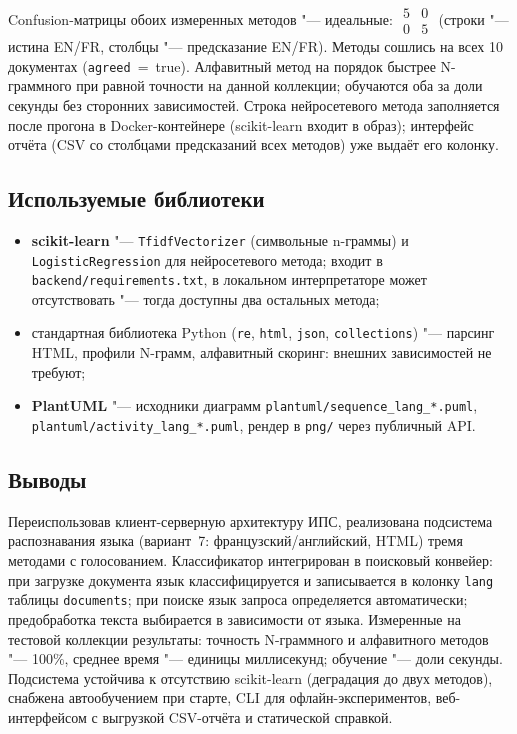 Confusion-матрицы обоих измеренных методов "--- идеальные:
$\begin{smallmatrix} 5 & 0 \\ 0 & 5 \end{smallmatrix}$
(строки "--- истина EN/FR, столбцы "--- предсказание EN/FR).
Методы сошлись на всех 10 документах (\texttt{agreed}~=~true).
Алфавитный метод на порядок быстрее N-граммного при равной точности
на данной коллекции; обучаются оба за доли секунды без сторонних
зависимостей. Строка нейросетевого метода заполняется после прогона
в Docker-контейнере (scikit-learn входит в образ); интерфейс отчёта
(CSV со столбцами предсказаний всех методов) уже выдаёт его колонку.

\subsection{Используемые библиотеки}

\begin{itemize}
	\item \textbf{scikit-learn} "--- \texttt{TfidfVectorizer} (символьные n-граммы) и \texttt{LogisticRegression} для нейросетевого метода; входит в \texttt{backend/requirements.txt}, в локальном интерпретаторе может отсутствовать "--- тогда доступны два остальных метода;
	\item стандартная библиотека Python (\texttt{re}, \texttt{html}, \texttt{json}, \texttt{collections}) "--- парсинг HTML, профили N-грамм, алфавитный скоринг: внешних зависимостей не требуют;
	\item \textbf{PlantUML} "--- исходники диаграмм \texttt{plantuml/sequence\_lang\_*.puml}, \texttt{plantuml/activity\_lang\_*.puml}, рендер в \texttt{png/} через публичный API.
\end{itemize}

\subsection{Выводы}

Переиспользовав клиент-серверную архитектуру ИПС, реализована подсистема
распознавания языка (вариант~7: французский/английский, HTML) тремя
методами с голосованием. Классификатор интегрирован в поисковый конвейер:
при загрузке документа язык классифицируется и записывается в колонку
\texttt{lang} таблицы \texttt{documents}; при поиске язык запроса
определяется автоматически; предобработка текста выбирается в зависимости
от языка. Измеренные на тестовой коллекции результаты: точность
N-граммного и алфавитного методов "--- 100\%, среднее время "--- единицы
миллисекунд; обучение "--- доли секунды. Подсистема устойчива к отсутствию
scikit-learn (деградация до двух методов), снабжена автообучением при старте,
CLI для офлайн-экспериментов, веб-интерфейсом с выгрузкой CSV-отчёта и
статической справкой.
